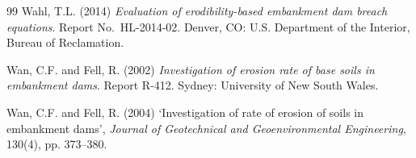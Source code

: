 \documentclass[11pt,a4paper]{report}
\begin{document}
\begin{thebibliography}{99}
Wahl, T.L. (2014) \emph{Evaluation of erodibility-based embankment dam breach equations}. Report
No.\ HL-2014-02. Denver, CO: U.S. Department of the Interior, Bureau of Reclamation.

Wan, C.F. and Fell, R. (2002) \emph{Investigation of erosion rate of base soils in embankment dams}.
Report R-412. Sydney: University of New South Wales.

Wan, C.F. and Fell, R. (2004) `Investigation of rate of erosion of soils in embankment dams',
\emph{Journal of Geotechnical and Geoenvironmental Engineering}, 130(4), pp. 373--380.

\end{thebibliography}
\end{document}
